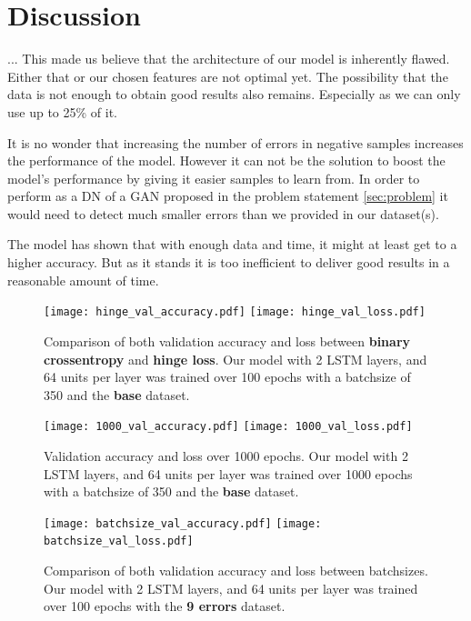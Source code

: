 \documentclass[
	ngerman,
	ruledheaders=section,%
	class=report,%
	thesis={type=bachelor},%
	accentcolor=9c,%
	custommargins=true,%
	marginpar=false,%
	parskip=half-,%
	fontsize=11pt,%
]{tudapub}
\begin{document}
\section{Discussion}
\label{sec:exDiscussion}

... This made us believe that the architecture of our model is inherently flawed.
Either that or our chosen features are not optimal yet.
The possibility that the data is not enough to obtain good results also remains.
Especially as we can only use up to 25\% of it.

It is no wonder that increasing the number of errors in negative samples increases the performance of the model.
However it can not be the solution to boost the model's performance by giving it easier samples to learn from.
In order to perform as a DN of a GAN proposed in the problem statement \ref{sec:problem} it would need to detect much smaller errors than we provided in our dataset(s).

The model has shown that with enough data and time, it might at least get to a higher accuracy.
But as it stands it is too inefficient to deliver good results in a reasonable amount of time.

\begin{figure}
    \texttt{[image: hinge\_val\_accuracy.pdf]}
    \texttt{[image: hinge\_val\_loss.pdf]}
    \caption{Comparison of both validation accuracy and loss between \textbf{binary crossentropy} and \textbf{hinge loss}.
             Our model with 2 LSTM layers, and 64 units per layer was trained over 100 epochs with a batchsize of 350 and the \textbf{base} dataset.}
    \label{fig:hinge}
\end{figure}

\begin{figure}
    \texttt{[image: 1000\_val\_accuracy.pdf]}
    \texttt{[image: 1000\_val\_loss.pdf]}
    \caption{Validation accuracy and loss over 1000 epochs.
    Our model with 2 LSTM layers, and 64 units per layer was trained over 1000 epochs with a batchsize of 350 and the \textbf{base} dataset.}
    \label{fig:1000epochs}
\end{figure}

\begin{figure}
    \texttt{[image: batchsize\_val\_accuracy.pdf]}
    \texttt{[image: batchsize\_val\_loss.pdf]}
    \caption{Comparison of both validation accuracy and loss between batchsizes.
    Our model with 2 LSTM layers, and 64 units per layer was trained over 100 epochs with the \textbf{9 errors} dataset.}
    \label{fig:batchsize}
\end{figure}
\end{document}
